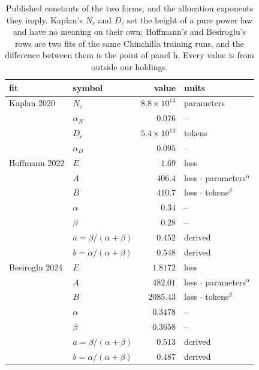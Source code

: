\begin{table}[htbp]
\centering\footnotesize
\caption{Published constants of the two forms, and the allocation exponents they imply. Kaplan's $N_c$ and $D_c$ set the height of a pure power law and have no meaning on their own; Hoffmann's and Besiroglu's rows are two fits of the same Chinchilla training runs, and the difference between them is the point of panel h. Every value is from outside our holdings.}
\label{tab:constants}
\begin{tabular}{llrl}
\toprule
fit & symbol & value & units \\
\midrule
Kaplan 2020 & $N_c$ & $8.8\times 10^{13}$ & parameters \\
 & $\alpha_N$ & $0.076$ & -- \\
 & $D_c$ & $5.4\times 10^{13}$ & tokens \\
 & $\alpha_D$ & $0.095$ & -- \\
\addlinespace
Hoffmann 2022 & $E$ & $1.69$ & loss \\
 & $A$ & $406.4$ & loss $\cdot$ parameters$^{\alpha}$ \\
 & $B$ & $410.7$ & loss $\cdot$ tokens$^{\beta}$ \\
 & $\alpha$ & $0.34$ & -- \\
 & $\beta$ & $0.28$ & -- \\
 & $a = \beta / (\alpha + \beta)$ & $0.452$ & derived \\
 & $b = \alpha / (\alpha + \beta)$ & $0.548$ & derived \\
\addlinespace
Besiroglu 2024 & $E$ & $1.8172$ & loss \\
 & $A$ & $482.01$ & loss $\cdot$ parameters$^{\alpha}$ \\
 & $B$ & $2085.43$ & loss $\cdot$ tokens$^{\beta}$ \\
 & $\alpha$ & $0.3478$ & -- \\
 & $\beta$ & $0.3658$ & -- \\
 & $a = \beta / (\alpha + \beta)$ & $0.513$ & derived \\
 & $b = \alpha / (\alpha + \beta)$ & $0.487$ & derived \\
\bottomrule
\end{tabular}
\end{table}
